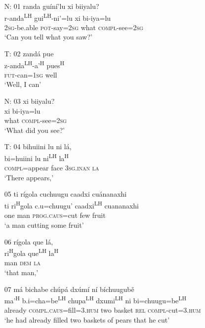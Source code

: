 

\begin{itemize}

\item[N: 01]
randa gu\'{i}n\'{i}'lu xi biiyalu?\\
r-anda\textsuperscript{LH} gui\textsuperscript{LH}-ni'=lu xi bi-iya=lu\\
\textsc{2sg}-be.able \textsc{pot}-say=\textsc{2sg} what \textsc{compl}-see=\textsc{2sg}\\
\glt `Can you tell what you saw?' 
 

\item[T: 02]
\glll zand\'{a} pue\\
z-anda\textsuperscript{LH}-a'\textsuperscript{H} pues\textsuperscript{H}\\
\textsc{fut}-can=\textsc{1sg} well\\
\glt `Well, I can'
 

\item[N: 03]
xi biiyalu?\\
xi bi-iya=lu\\
what \textsc{compl}-see=\textsc{2sg}\\
\glt `What did you see?'


\item[T: 04]
\glll bihuiini lu ni l\'{a},\\
bi=huiini lu ni\textsuperscript{LH} la\textsuperscript{H}\\
\textsc{compl}=appear face \textsc{3sg.inan} \textsc{la}\\
\glt `There appears,'


\item[05]
\glll ti r\'{i}gola cuchuugu caadxi cu\'{a}nanaxhi\\
ti ri\textsuperscript{H}gola c.u=chuugu' caadxi\textsuperscript{LH} cuananaxhi\\
one man \textsc{prog}.\textsc{caus}=cut few fruit\\
\glt `a man cutting some fruit'


\item[06]
\glll r\'{i}gola que l\'{a},\\
ri\textsuperscript{H}gola que\textsuperscript{LH} la\textsuperscript{H}\\
man \textsc{dem} \textsc{la}\\
\glt `that man,'


\item[07]
\glll m\'{a} bichabe ch\'{u}p\'{a} dx\'{u}m\'{i} n\'{i} b\'{i}chuugub\v{e}\\
ma'\textsuperscript{H} b.i=cha=be\textsuperscript{LH}  chupa\textsuperscript{LH} dxumi\textsuperscript{LH} ni bi=chuugu=be\textsuperscript{LH}\\
already \textsc{compl}.\textsc{caus}=fill=\textsc{3.hum} two basket \textsc{rel} \textsc{compl}-cut=\textsc{3.hum}\\
\glt `he had already filled two baskets of pears that he cut'



\end{itemize}
